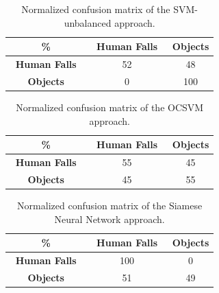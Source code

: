 \begin{table}[htb]
	\caption{Normalized confusion matrix of the SVM-unbalanced approach.}
	\label{tab:cm_svmo}
	\begin{center}
		
		\begin{tabular}[htb]{c|c|c}	
			\hline
			\textbf{\%} & \textbf{$\,$ Human Falls $\,$ } & \textbf{Objects} \\ %
			
			\hline
			\textbf{$\,$ Human Falls $\,$ }     			& 52    &   48     \\
			\textbf{Objects} 								& 0    &   100     	\\
			\hline
		\end{tabular}
	\end{center}
\end{table}
\begin{table}[htb]
	\caption{Normalized confusion matrix of the OCSVM approach.}
	\label{tab:cm_ocsvm}
	\begin{center}
		
		\begin{tabular}[htb]{c|c|c}	
			\hline
			\textbf{\%} & \textbf{$\,$ Human Falls $\,$ } & \textbf{Objects} \\ %
			
			\hline
			\textbf{$\,$ Human Falls $\,$ }     			& 55    &   45     \\
			\textbf{Objects} 								& 45    &   55     \\
			\hline
		\end{tabular}
	\end{center}
\end{table}
\begin{table}[htb]
	\caption{Normalized confusion matrix of the Siamese Neural Network approach.}
	\label{tab:cm_siamese}
	\begin{center}
		\begin{tabular}[htb]{c|c|c}	
			\hline
			\textbf{\%} & \textbf{$\,$ Human Falls $\,$ } & \textbf{Objects} \\ %
			\hline
			\textbf{$\,$ Human Falls $\,$ }     			& 100    &   0     \\
			\textbf{Objects} 								& 51     &   49    \\
			\hline
		\end{tabular}
	\end{center}
\end{table}

